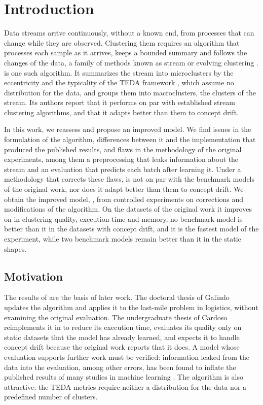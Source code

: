 \chapter{Introduction}
\label{chap:intro}

Data streams arrive continuously, without a known end, from processes that can change while they are observed. Clustering them requires an algorithm that processes each sample as it arrives, keeps a bounded summary and follows the changes of the data, a family of methods known as stream or evolving clustering \cite{aggarwal2003framework,cao2006density,wang2023data}. \MicroTEDAClus \cite{maia2020evolvclus} is one such algorithm. It summarizes the stream into microclusters by the eccentricity and the typicality of the TEDA framework \cite{angelov2014outside}, which assume no distribution for the data, and groups them into macroclusters, the clusters of the stream. Its authors report that it performs on par with established stream clustering algorithms, and that it adapts better than them to concept drift.

In this work, we reassess \MicroTEDAClus and propose an improved model. We find issues in the formulation of the algorithm, differences between it and the implementation that produced the published results, and flaws in the methodology of the original experiments, among them a preprocessing that leaks information about the stream and an evaluation that predicts each batch after learning it. Under a methodology that corrects these flaws, \MicroTEDAClus is not on par with the benchmark models of the original work, nor does it adapt better than them to concept drift. We obtain the improved model, \MicroTEDAClusPlus, from controlled experiments on corrections and modifications of the algorithm. On the datasets of the original work it improves on \MicroTEDAClus in clustering quality, execution time and memory, no benchmark model is better than it in the datasets with concept drift, and it is the fastest model of the experiment, while two benchmark models remain better than it in the static shapes.

\section{Motivation}
\label{sec:motivation}

The results of \MicroTEDAClus are the basis of later work. The doctoral thesis of Galindo~\cite{galindo2021lastmile} updates the algorithm and applies it to the last-mile problem in logistics, without examining the original evaluation. The undergraduate thesis of Cardoso~\cite{cardoso2022microtedaclus} reimplements it in  to reduce its execution time, evaluates its quality only on static datasets that the model has already learned, and expects it to handle concept drift because the original work reports that it does. A model whose evaluation supports further work must be verified: information leaked from the data into the evaluation, among other errors, has been found to inflate the published results of many studies in machine learning \cite{kaufman2012leakage,kapoor2023leakage}. The algorithm is also attractive: the TEDA metrics require neither a distribution for the data nor a predefined number of clusters.

